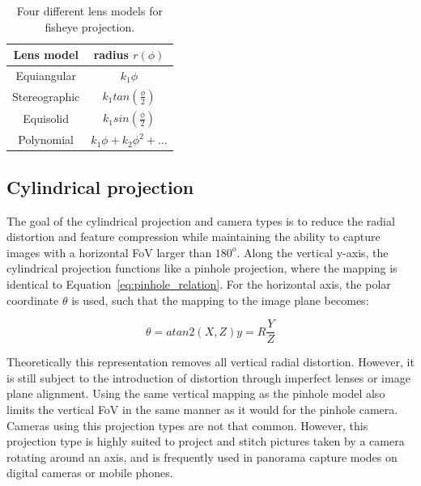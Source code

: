 \begin{table}[!htb]
    \centering
    \caption{Four different lens models for fisheye projection.}
    \label{tab:theory_fisheye_lens_model}
    \begin{tabular}{|c|c|} \hline
        Lens model & radius $r(\phi)$ \\ \hline
        Equiangular & $k_1\phi$\\ \hline
        Stereographic & $k_1 tan\left(\frac{\phi}{2}\right)$\\ \hline
        Equisolid & $k_1 sin\left(\frac{\phi}{2}\right)$\\ \hline 
        Polynomial & $k_1 \phi + k_2 \phi^2 + ...$\\ \hline
    \end{tabular}
\end{table}

\subsection{Cylindrical projection}

The goal of the cylindrical projection and camera types is to reduce the radial distortion and feature compression while maintaining the ability to capture images with a horizontal FoV larger than $180^o$. Along the vertical y-axis, the cylindrical projection functions like a pinhole projection, where the mapping is identical to Equation~\eqref{eq:pinhole_relation}. For the horizontal axis, the polar coordinate $\theta$ is used, such that the mapping to the image plane becomes:

\begin{subequations}
\begin{equation}
    \theta = atan2\left(X,Z\right)
    \label{eq:cylindrical_theta}
\end{equation}
\begin{equation}
    y = R\frac{Y}{Z}
    \label{eq:cylindrical_y}
\end{equation}
\label{eq:cylindrical}
\end{subequations}

Theoretically this representation removes all vertical radial distortion. However, it is still subject to the introduction of distortion through imperfect lenses or image plane alignment. Using the same vertical mapping as the pinhole model also limits the vertical FoV in the same manner as it would for the pinhole camera. Cameras using this projection types are not that common. However, this projection type is highly suited to project and stitch pictures taken by a camera rotating around an axis, and is frequently used in panorama capture modes on digital cameras or mobile phones.

